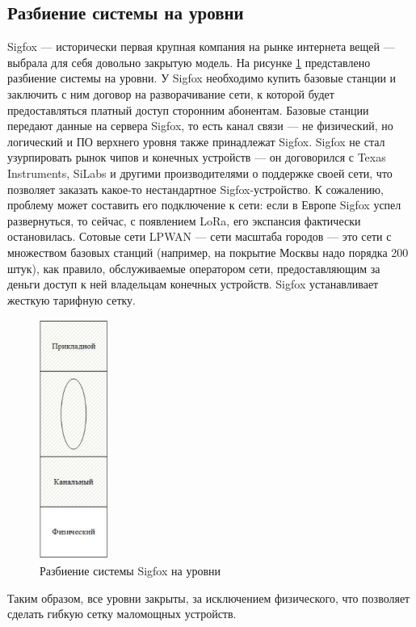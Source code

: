 \subsection{Разбиение системы на уровни}
Sigfox — исторически первая крупная компания на рынке интернета вещей — выбрала для себя довольно закрытую модель. На рисунке \ref{fig:img12} представлено разбиение системы на уровни. У Sigfox необходимо купить базовые станции и заключить с ним договор на разворачивание сети, к которой будет предоставляться платный доступ сторонним абонентам. Базовые станции передают данные на сервера Sigfox, то есть канал связи --- не физический, но логический и ПО верхнего уровня также принадлежат Sigfox. Sigfox не стал узурпировать рынок чипов и конечных устройств --- он договорился с Texas Instruments, SiLabs и другими производителями о поддержке своей сети, что позволяет заказать какое-то нестандартное Sigfox-устройство. К сожалению, проблему может составить его подключение к сети: если в Европе Sigfox успел развернуться, то сейчас, с появлением LoRa, его экспансия фактически остановилась.
Сотовые сети LPWAN --- сети масштаба городов --- это сети с множеством базовых
станций (например, на покрытие Москвы надо порядка 200 штук), как правило, обслуживаемые оператором сети, предоставляющим за деньги доступ к ней владельцам конечных устройств. Sigfox устанавливает жесткую тарифную сетку. 
\begin{figure}[H]
	\centering
	\includegraphics[width=0.2\textwidth]{img/kich_bur/12.pdf}
	\caption{Разбиение системы Sigfox на уровни}
	\label{fig:img12}
\end{figure}
Таким образом, все уровни закрыты, за исключением физического, что позволяет
сделать гибкую сетку маломощных устройств. 

